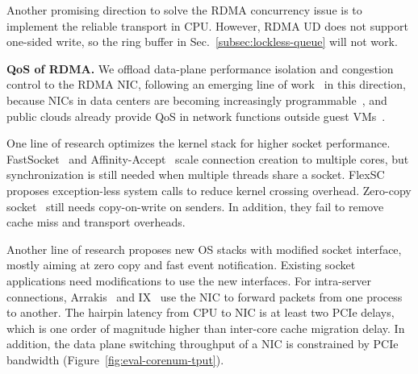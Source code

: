 Another promising direction to solve the RDMA concurrency issue is to implement the reliable transport in CPU. However, RDMA UD does not support one-sided write, so the ring buffer in Sec.~\ref{subsec:lockless-queue} will not work.

\textbf{QoS of RDMA.}
We offload data-plane performance isolation and congestion control to the RDMA NIC, following an emerging line of work~\cite{peter2016arrakis,zhu2015congestion,lu2017memory,mprdma,mittal2018revisiting} in this direction, because NICs in data centers are becoming increasingly programmable~\cite{smartnic,cavium,kaufmann2015flexnic,mellanox-innova,mellanox-bluefield}, and public clouds already provide QoS in network functions outside guest VMs~\cite{li2016clicknp,panda2016netbricks,floem-osdi18}.




\iffalse
{}
One line of research optimizes the kernel stack for higher socket performance. FastSocket~\cite{lin2016scalable} and Affinity-Accept~\cite{pesterev2012improving} scale connection creation to multiple cores, but synchronization is still needed when multiple threads share a socket.
FlexSC~\cite{soares2010flexsc} proposes exception-less system calls to reduce kernel crossing overhead.
Zero-copy socket~\cite{thadani1995efficient,chu1996zero} still needs copy-on-write on senders.
In addition, they fail to remove cache miss and transport overheads.


Another line of research proposes new OS stacks with modified socket interface, mostly aiming at zero copy and fast event notification. Existing socket applications need modifications to use the new interfaces.
For intra-server connections, Arrakis~\cite{peter2016arrakis} and IX~\cite{belay2017ix} use the NIC to forward packets from one process to another. The hairpin latency from CPU to NIC is at least two PCIe delays, which is one order of magnitude higher than inter-core cache migration delay. In addition, the data plane switching throughput of a NIC is constrained by PCIe bandwidth (Figure~\ref{fig:eval-corenum-tput}).

